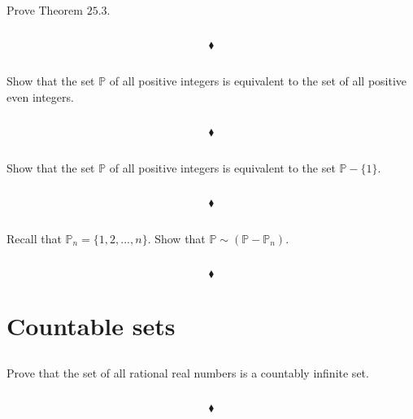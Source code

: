 \subsection{}
\begin{tcolorbox}
Prove Theorem $\mathbf{25.3}$. 
\end{tcolorbox}
$$ $$
 
$$\blacklozenge$$

\subsection{}
\begin{tcolorbox}
Show that the set $\mathbb{P}$ of all positive integers is equivalent to the set of all positive even integers.
\end{tcolorbox}
$$ $$
 
$$\blacklozenge$$

\subsection{}
\begin{tcolorbox}
Show that the set $\mathbb{P}$ of all positive integers is equivalent to the set $\mathbb{P}-\{1\}$.  
\end{tcolorbox}
$$ $$

$$\blacklozenge$$

\subsection{}
\begin{tcolorbox}
Recall that $\mathbb{P}_n = \{1, 2, ... , n\}$. Show that $\mathbb{P} \sim  (\mathbb{P}-\mathbb{P}_n)$.
\end{tcolorbox}
$$ $$

$$\blacklozenge$$

\newpage

 \section{Countable sets}
\subsection{}
\begin{tcolorbox}
Prove that the set of all rational real numbers is a countably infinite set. 
\end{tcolorbox}
$$ $$

$$\blacklozenge$$

